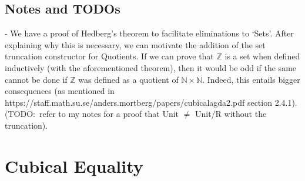 \documentclass[12pt,twoside,maitrise]{dms}
\theoremstyle{definition}
\numberwithin{equation}{section}
\numberwithin{table}{chapter}
\numberwithin{figure}{chapter}
\begin{document}
\section{Notes and TODOs}
- We have a proof of Hedberg's theorem to facilitate eliminations to `Sets'.
After explaining why this is necessary, we can motivate the addition of the set
truncation constructor for Quotients. If we can prove that $\mathbb{Z}$ is a set
when defined inductively (with the aforementioned theorem), then it would be odd
if the same cannot be done if $\mathbb{Z}$ was defined as a quotient of
$\mathbb{N} \times \mathbb{N}$. Indeed, this entails bigger consequences (as
mentioned in https://staff.math.su.se/anders.mortberg/papers/cubicalagda2.pdf
section 2.4.1). (TODO:\ refer to my notes for a proof that Unit $\ne$ Unit/R
without the truncation).



\chapter{Cubical Equality}\label{ch:cubical-equality}
\end{document}
